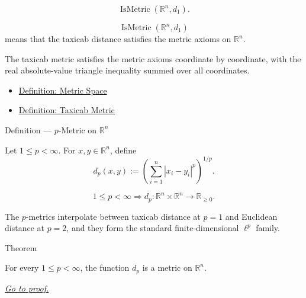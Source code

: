 \begin{remark*}
\[
\operatorname{IsMetric}(\mathbb{R}^n,d_1).
\]
\end{remark*}

\begin{remark*}
\[
\operatorname{IsMetric}(\mathbb{R}^n,d_1)
\]
means that the taxicab distance satisfies the metric axioms on
\(\mathbb{R}^n\).
\end{remark*}

\begin{remark*}[Interpretation]
The taxicab metric satisfies the metric axioms coordinate by coordinate, with
the real absolute-value triangle inequality summed over all coordinates.
\end{remark*}

\begin{dependencies}
\begin{itemize}
  \item \hyperref[def:metric-space]{Definition: Metric Space}
  \item \hyperref[def:taxicab-metric-rn]{Definition: Taxicab Metric}
\end{itemize}
\end{dependencies}

\begin{definitionbox}{Definition --- \(p\)-Metric on \(\mathbb{R}^n\)}
\begin{definition}\label{def:lp-metric-rn}
Let \(1\leq p<\infty\).  For \(x,y\in\mathbb{R}^n\), define
\[
  d_p(x,y)
  :=
  \left(\sum_{i=1}^{n}|x_i-y_i|^p\right)^{1/p}.
\]
\end{definition}
\end{definitionbox}

\begin{remark*}
\[
1\leq p<\infty
\Longrightarrow
d_p:\mathbb{R}^n\times\mathbb{R}^n\to\mathbb{R}_{\geq 0}.
\]
\end{remark*}

\begin{remark*}[Interpretation]
The \(p\)-metrics interpolate between taxicab distance at \(p=1\) and
Euclidean distance at \(p=2\), and they form the standard finite-dimensional
\(\ell^p\) family.
\end{remark*}

\DefinitionalRoot

\begin{theorembox}{Theorem}
\begin{theorem}[\(d_p\) is a Metric]\label{thm:lp-metric-rn}
For every \(1\leq p<\infty\), the function \(d_p\) is a metric on
\(\mathbb{R}^n\).

\smallskip
\noindent
\hyperref[prf:lp-metric-rn]{\textit{Go to proof.}}
\end{theorem}
\end{theorembox}

